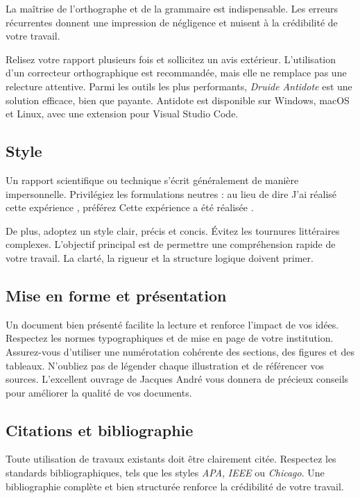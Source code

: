 La maîtrise de l'orthographe et de la grammaire est indispensable. Les erreurs récurrentes donnent une impression de négligence et nuisent à la crédibilité de votre travail.

Relisez votre rapport plusieurs fois et sollicitez un avis extérieur. L'utilisation d'un correcteur orthographique est recommandée, mais elle ne remplace pas une relecture attentive. Parmi les outils les plus performants, \textit{Druide Antidote} est une solution efficace, bien que payante. Antidote est disponible sur Windows, macOS et Linux, avec une extension pour Visual Studio Code.

\subsection{Style}

Un rapport scientifique ou technique s'écrit généralement de manière impersonnelle. Privilégiez les formulations neutres : au lieu de dire \og J'ai réalisé cette expérience \fg, préférez \og Cette expérience a été réalisée \fg.

De plus, adoptez un style clair, précis et concis. Évitez les tournures littéraires complexes. L'objectif principal est de permettre une compréhension rapide de votre travail. La clarté, la rigueur et la structure logique doivent primer.

\subsection{Mise en forme et présentation}

Un document bien présenté facilite la lecture et renforce l'impact de vos idées. Respectez les normes typographiques et de mise en page de votre institution. Assurez-vous d'utiliser une numérotation cohérente des sections, des figures et des tableaux. N'oubliez pas de légender chaque illustration et de référencer vos sources. L'excellent ouvrage de Jacques André \cite{andre90} vous donnera de précieux conseils pour améliorer la qualité de vos documents.

\subsection{Citations et bibliographie}

Toute utilisation de travaux existants doit être clairement citée. Respectez les standards bibliographiques, tels que les styles \textit{APA}, \textit{IEEE} ou \textit{Chicago}. Une bibliographie complète et bien structurée renforce la crédibilité de votre travail.

